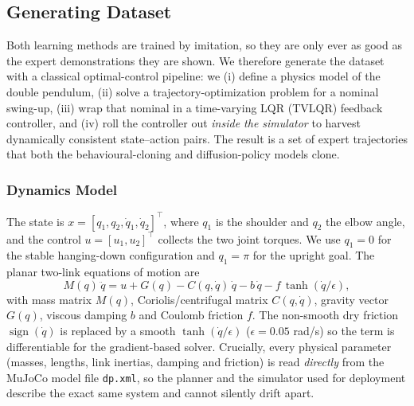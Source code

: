 \documentclass[11pt,a4paper]{article}
\newcommand{\file}[1]{\texttt{#1}}
\begin{document}
\subsection{Generating Dataset}
Both learning methods are trained by imitation, so they are only ever as good as
the expert demonstrations they are shown. We therefore generate the dataset with a
classical optimal-control pipeline: we (i) define a physics model of the double
pendulum, (ii) solve a trajectory-optimization problem for a nominal swing-up,
(iii) wrap that nominal in a time-varying LQR (TVLQR) feedback controller, and
(iv) roll the controller out \emph{inside the simulator} to harvest dynamically
consistent state--action pairs. The result is a set of expert trajectories that
both the behavioural-cloning and diffusion-policy models clone.

\subsubsection{Dynamics Model}
The state is $x = [q_1, q_2, \dot{q}_1, \dot{q}_2]^\top$, where $q_1$ is the
shoulder and $q_2$ the elbow angle, and the control $u = [u_1, u_2]^\top$ collects
the two joint torques. We use $q_1 = 0$ for the stable hanging-down configuration
and $q_1 = \pi$ for the upright goal. The planar two-link equations of motion are
\begin{equation}
  M(q)\,\ddot{q} = u + G(q) - C(q,\dot{q})\,\dot{q} - b\,\dot{q}
                   - f\,\tanh\!\left(\dot{q}/\epsilon\right),
\end{equation}
with mass matrix $M(q)$, Coriolis/centrifugal matrix $C(q,\dot{q})$, gravity
vector $G(q)$, viscous damping $b$ and Coulomb friction $f$. The non-smooth dry
friction $\operatorname{sign}(\dot{q})$ is replaced by a smooth
$\tanh(\dot{q}/\epsilon)$ ($\epsilon = 0.05$ rad/s) so the term is differentiable
for the gradient-based solver. Crucially, every physical parameter (masses,
lengths, link inertias, damping and friction) is read \emph{directly} from the
MuJoCo model file \file{dp.xml}, so the planner and the simulator used for
deployment describe the exact same system and cannot silently drift apart.
\end{document}

